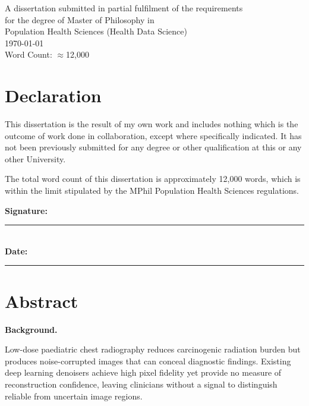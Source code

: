\documentclass[12pt, a4paper, twoside, openright]{book}
\begin{document}
\begin{titlepage}
  {\large A dissertation submitted in partial fulfilment of the requirements\\
  for the degree of Master of Philosophy in\\
  Population Health Sciences (Health Data Science)}\\[0.8cm]

  {\large \today}\\[0.5cm]
  {\large Word Count: $\approx$12{,}000}

  \vfill
\end{titlepage}

\chapter*{Declaration}

This dissertation is the result of my own work and includes nothing which is the outcome of work done in collaboration, except where specifically indicated. It has not been previously submitted for any degree or other qualification at this or any other University.

The total word count of this dissertation is approximately 12{,}000 words, which is within the limit stipulated by the MPhil Population Health Sciences regulations.

\vspace{2cm}
\noindent\textbf{Signature:} \rule{6cm}{0.4pt}\\[0.5em]
\textbf{Date:} \rule{6cm}{0.4pt}

\newpage

\chapter*{Abstract}

\textbf{Background.}

Low-dose paediatric chest radiography reduces carcinogenic radiation burden but produces noise-corrupted images that can conceal diagnostic findings. Existing deep learning denoisers achieve high pixel fidelity yet provide no measure of reconstruction confidence, leaving clinicians without a signal to distinguish reliable from uncertain image regions.
\end{document}
